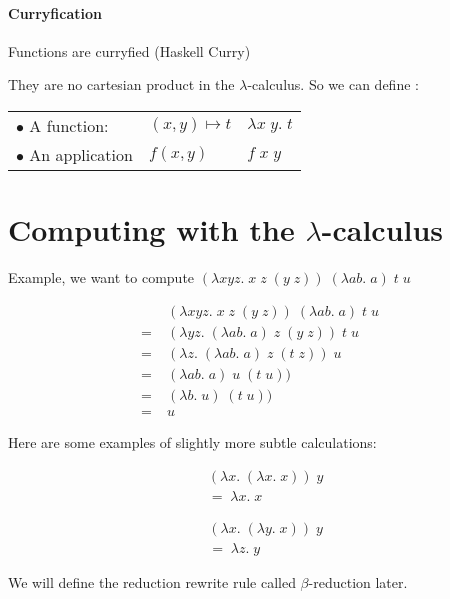   \paragraph{Curryfication} Functions are curryfied (Haskell Curry)

  They are no cartesian product in the $\lambda$-calculus. So we can define :

  \begin{center}
  \begin{tabular}{l l l}
    $\bullet$ A function: & $(x, y)\mapsto t$ & $\lambda x\;y.\; t$ \\
    $\bullet$ An application & $f(x, y)$ & $f\; x\; y$
  \end{tabular}
  \end{center}

  \section{Computing with the $\lambda$-calculus}

  Example, we want to compute $(\lambda x y z.\; x\; z\; (y\; z))\; (\lambda a
  b.\; a)\; t\; u$

  \begin{align*}
    &\;(\lambda x y z.\; x\; z\; (y\; z))\; (\lambda a b.\; a)\; t\; u \\
    =&\;(\lambda y z.\; (\lambda a b.\; a)\; z\; (y\; z))\; t\; u \\
    =&\;(\lambda z.\; (\lambda a b.\; a)\; z\; (t\; z))\; u \\
    =&\;(\lambda a b.\; a)\; u\; (t\; u))\\
    =&\;(\lambda b.\; u)\; (t\; u))\\
    =&\;u
  \end{align*}

  Here are some examples of slightly more subtle calculations:
  \begin{multicols}{2}
    \begin{align*}
      &(\lambda x.\; (\lambda x.\; x))\; y \\
      &=\; \lambda x.\; x
    \end{align*}

    \begin{align*}
      &(\lambda x.\; (\lambda y.\; x))\; y \\
      &=\; \lambda z.\; y
    \end{align*}
  \end{multicols}

  We will define the reduction rewrite rule called $\beta$-reduction later.

